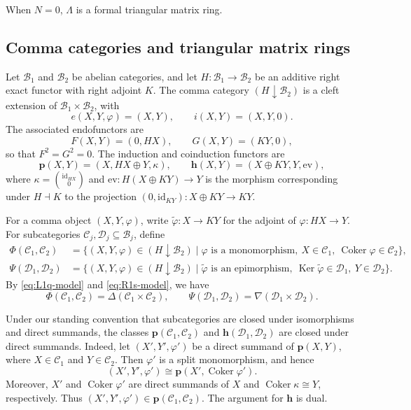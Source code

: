 \documentclass[11pt]{amsart}
\theoremstyle{definition}
\theoremstyle{remark}
\theoremstyle{plain}
\numberwithin{equation}{section}
\begin{document}
When $N=0$, $\Lambda$ is a formal triangular matrix ring.

\subsection{Comma categories and triangular matrix rings}
\label{subsec:triangular}

Let $\mathcal{B}_1$ and $\mathcal{B}_2$ be abelian categories, and let $H:\mathcal{B}_1\to\mathcal{B}_2$ be an additive right exact functor with right adjoint $K$.
The comma category $(H\downarrow\mathcal{B}_2)$ is a cleft extension of $\mathcal{B}_1\times\mathcal{B}_2$, with
\[
e(X,Y,\varphi)=(X,Y),
\qquad
i(X,Y)=(X,Y,0).
\]
The associated endofunctors are
\[
F(X,Y)=(0,HX),
\qquad
G(X,Y)=(KY,0),
\]
so that $F^2=G^2=0$. The induction and coinduction functors are
\begin{equation}\label{eq:comma-adjoints}
	\mathbf p(X,Y)=(X,HX\oplus Y,\kappa),
	\qquad
	\mathbf h(X,Y)=(X\oplus KY,Y,\mathrm{ev}),
\end{equation}
where $\kappa=\binom{\mathrm{id}_{HX}}{0}$ and
$\mathrm{ev}:H(X\oplus KY)\to Y$ is the morphism corresponding under $H\dashv K$ to the projection
$(0,\mathrm{id}_{KY}):X\oplus KY\to KY$.

For a comma object $(X,Y,\varphi)$, write
$\widetilde{\varphi}:X\to KY$ for the adjoint of
$\varphi:HX\to Y$. For subcategories $\mathcal{C}_j,\mathcal{D}_j\subseteq\mathcal{B}_j$,
define
\[
\begin{split}
	\Phi(\mathcal{C}_1,\mathcal{C}_2)
	&=\{(X,Y,\varphi)\in(H\downarrow\mathcal{B}_2)
	\mid \varphi\text{ is a monomorphism},\
	X\in\mathcal{C}_1,\
	\operatorname{Coker}\varphi\in\mathcal{C}_2\},\\
	\Psi(\mathcal{D}_1,\mathcal{D}_2)
	&=\{(X,Y,\varphi)\in(H\downarrow\mathcal{B}_2)
	\mid \widetilde{\varphi}\text{ is an epimorphism},\
	\operatorname{Ker}\widetilde{\varphi}\in\mathcal{D}_1,\
	Y\in\mathcal{D}_2\}.
\end{split}
\]
By \eqref{eq:L1q-model} and \eqref{eq:R1s-model}, we have
\[
\Phi(\mathcal{C}_1,\mathcal{C}_2)
=\Delta(\mathcal{C}_1\times\mathcal{C}_2),
\qquad
\Psi(\mathcal{D}_1,\mathcal{D}_2)
=\nabla(\mathcal{D}_1\times\mathcal{D}_2).
\]

Under our standing convention that subcategories are closed under isomorphisms and direct summands, the classes
$\mathbf p(\mathcal{C}_1,\mathcal{C}_2)$ and
$\mathbf h(\mathcal{D}_1,\mathcal{D}_2)$ are closed under direct summands. Indeed, let $(X',Y',\varphi')$ be a direct summand of
$\mathbf p(X,Y)$, where $X\in\mathcal{C}_1$ and
$Y\in\mathcal{C}_2$. Then $\varphi'$ is a split monomorphism, and hence
\[
(X',Y',\varphi')
\cong\mathbf p(X',\operatorname{Coker}\varphi').
\]
Moreover, $X'$ and $\operatorname{Coker}\varphi'$ are direct summands of $X$ and $\operatorname{Coker}\kappa\cong Y$, respectively. Thus $(X',Y',\varphi')\in\mathbf p(\mathcal{C}_1,\mathcal{C}_2)$. The argument for $\mathbf h$ is dual.
\end{document}
